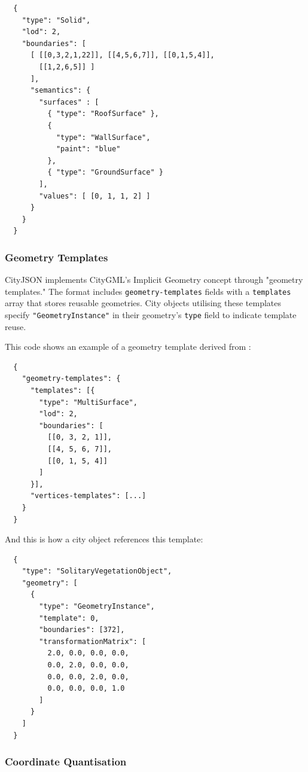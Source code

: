 \begin{lstlisting}
  {
    "type": "Solid",
    "lod": 2,
    "boundaries": [
      [ [[0,3,2,1,22]], [[4,5,6,7]], [[0,1,5,4]],
        [[1,2,6,5]] ]
      ],
      "semantics": {
        "surfaces" : [
          { "type": "RoofSurface" },
          {
            "type": "WallSurface",
            "paint": "blue"
          },
          { "type": "GroundSurface" }
        ],
        "values": [ [0, 1, 1, 2] ]
      }
    }
  }
\end{lstlisting}

\subsubsection{Geometry Templates}
\label{rw:cityjson:geometry_templates}

CityJSON implements CityGML's Implicit Geometry concept through "geometry templates." The format includes \texttt{geometry-templates} fields with a \texttt{templates} array that stores reusable geometries. City objects utilising these templates specify \texttt{"GeometryInstance"} in their geometry's \texttt{type} field to indicate template reuse.

This code shows an example of a geometry template derived from \citet{ledoux_2019}:

\begin{lstlisting}
  {
    "geometry-templates": {
      "templates": [{
        "type": "MultiSurface",
        "lod": 2,
        "boundaries": [
          [[0, 3, 2, 1]],
          [[4, 5, 6, 7]],
          [[0, 1, 5, 4]]
        ]
      }],
      "vertices-templates": [...]
    }
  }
\end{lstlisting}

And this is how a city object references this template:

\begin{lstlisting}
  {
    "type": "SolitaryVegetationObject",
    "geometry": [
      {
        "type": "GeometryInstance",
        "template": 0,
        "boundaries": [372],
        "transformationMatrix": [
          2.0, 0.0, 0.0, 0.0,
          0.0, 2.0, 0.0, 0.0,
          0.0, 0.0, 2.0, 0.0,
          0.0, 0.0, 0.0, 1.0
        ]
      }
    ]
  }
\end{lstlisting}

\subsubsection{Coordinate Quantisation}
\label{rw:cityjson:coordinate_quantisation}

